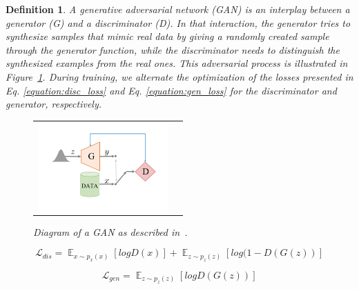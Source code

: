 \documentclass[12pt]{article}
\newtheorem{definition}{Definition}
\begin{document}
    \begin{definition}
        \normalfont
        A \emph{generative adversarial network} (GAN) \cite{NIPS2014_5ca3e9b1} is an interplay between a \emph{generator} (G) and a \emph{discriminator} (D).
        In that interaction, the generator tries to synthesize samples that mimic real data by giving a randomly created sample through the generator function, while the discriminator needs to distinguish the synthesized examples from the real ones. This adversarial process is illustrated in Figure~\ref{figure:diagram_of_gan}. During training, we alternate the optimization of the losses presented in Eq. \ref{equation:disc_loss} and Eq. \ref{equation:gen_loss} for the discriminator and generator, respectively.

        \begin{figure}[H]
            \centering
            \begin{tabular}{cc}
                \includegraphics[width = 50mm]{gan}
            \end{tabular}
            \caption{Diagram of a GAN as described in~\cite{pmlr-v80-achlioptas18a}.}
            \label{figure:diagram_of_gan}
        \end{figure}

        \begin{equation}
            \mathcal{L}_{dis} = \mathop{\mathbb{E}}_{x \sim p_x(x)}[log D(x)] + \mathop{\mathbb{E}}_{z \sim p_z(z)}[log (1 - D(G(z))]
            \label{equation:dis_loss}
        \end{equation}

        \begin{equation}
            \mathcal{L}_{gen} = \mathop{\mathbb{E}}_{z \sim p_z(z)}[log D(G(z))]
            \label{equation:gen_loss}
        \end{equation}

    \end{definition}
\end{document}
